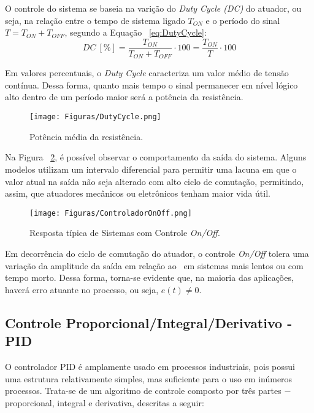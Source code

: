         O controle do sistema se baseia na varição do \textit{Duty Cycle (DC)} do atuador, ou seja, na relação entre o tempo de sistema ligado $T_{ON}$ e o período do sinal $T = T_{ON}+T_{OFF}$, segundo a Equação ~\ref{eq:DutyCycle}:
        \begin{equation}
            \label{eq:DutyCycle}
            DC \ [\%]=\dfrac{T_{ON}}{T_{ON}+T_{OFF}}\cdot100=\dfrac{T_{ON}}{T}\cdot100
        \end{equation}
        
        Em valores percentuais, o \textit{Duty Cycle} caracteriza um valor médio de tensão contínua. Dessa forma, quanto mais tempo o sinal permanecer em nível lógico alto dentro de um período maior será a potência da resistência.
        \begin{figure}[H]
            \centering
            \texttt{[image: Figuras/DutyCycle.png]}
            \caption{Potência média da resistência.} \label{fig:DuteCycle}
        \end{figure}
        
        Na Figura ~\ref{FiguraOnOff}, é possível observar o comportamento da saída do sistema. Alguns modelos utilizam um intervalo diferencial para permitir uma lacuna em que o valor atual na saída não seja alterado com alto ciclo de comutação, permitindo, assim, que atuadores mecânicos ou eletrônicos tenham maior vida útil.
        \begin{figure}[H]
          \centering
          \texttt{[image: Figuras/ControladorOnOff.png]}
          \caption{Resposta típica de Sistemas com Controle \textit{On/Off}.} \label{FiguraOnOff} 
        \end{figure}
        
        Em decorrência do ciclo de comutação do atuador, o controle \textit{On/Off} tolera uma variação da amplitude da saída em relação ao \SetPoint \ em sistemas mais lentos ou com tempo morto. Dessa forma, torna-se evidente que, na maioria das aplicações, haverá erro atuante no processo, ou seja, $e(t) \neq 0$.
\subsection{Controle Proporcional/Integral/Derivativo - PID}
O controlador PID é amplamente usado em processos industriais, pois possui uma estrutura relativamente simples, mas suficiente para o uso em inúmeros processos. Trata-se de um algoritmo de controle composto por três partes $-$ proporcional, integral e derivativa, descritas a seguir:

